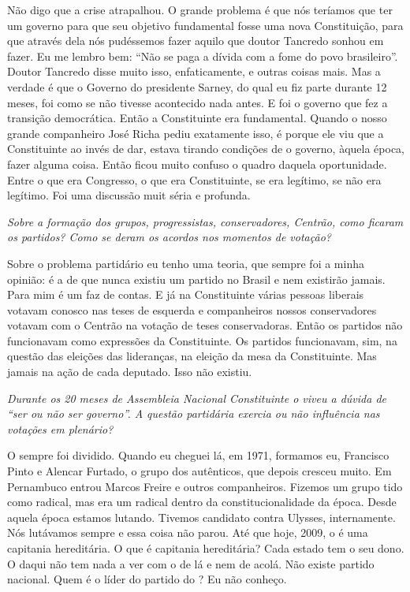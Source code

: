 Não digo que a crise atrapalhou. O grande problema é que
nós teríamos que ter um governo para que seu objetivo fundamental fosse
uma nova Constituição, para que através dela nós pudéssemos fazer aquilo
que doutor Tancredo sonhou em fazer. Eu me lembro bem: ``Não se paga a
dívida com a fome do povo brasileiro''. Doutor Tancredo disse muito
isso, enfaticamente, e outras coisas mais. Mas a verdade é que o Governo
do presidente Sarney, do qual eu fiz parte durante 12 meses, foi como se
não tivesse acontecido nada antes. E foi o governo que fez a transição
democrática. Então a Constituinte era fundamental. Quando o nosso grande
companheiro José Richa pediu exatamente isso, é porque ele viu que a
Constituinte ao invés de dar, estava tirando condições de o governo,
àquela época, fazer alguma coisa. Então ficou muito confuso o quadro
daquela oportunidade. Entre o que era Congresso, o que era Constituinte,
se era legítimo, se não era legítimo. Foi uma discussão muit séria e
profunda.

\medskip

\noindent\emph{Sobre a formação dos grupos, progressistas, conservadores,
Centrão, como ficaram os partidos? Como se deram os acordos nos
momentos de votação?}

Sobre o problema partidário eu tenho uma teoria, que
sempre foi a minha opinião: é a de que nunca existiu um partido no
Brasil e nem existirão jamais. Para mim é um faz de contas. E já na
Constituinte várias pessoas liberais votavam conosco nas teses de
esquerda e companheiros nossos conservadores votavam com o Centrão na
votação de teses conservadoras. Então os partidos não funcionavam como
expressões da Constituinte. Os partidos funcionavam, sim, na questão das
eleições das lideranças, na eleição da mesa da Constituinte. Mas jamais
na ação de cada deputado. Isso não existiu.

\medskip

\noindent\emph{Durante os 20 meses de Assembleia Nacional Constituinte o 
viveu a dúvida de ``ser ou não ser governo''. A questão partidária
exercia ou não influência nas votações em plenário?}

O  sempre foi dividido. Quando eu cheguei lá, em
1971, formamos eu, Francisco Pinto e Alencar Furtado, o grupo dos
autênticos, que depois cresceu muito. Em Pernambuco entrou Marcos Freire
e outros companheiros. Fizemos um grupo tido como radical, mas era um
radical dentro da constitucionalidade da época. Desde aquela época
estamos lutando. Tivemos candidato contra Ulysses, internamente. Nós
lutávamos sempre e essa coisa não parou. Até que hoje, 2009, o  é
uma capitania hereditária. O que é capitania hereditária? Cada estado
tem o seu dono. O  daqui não tem nada a ver com o  de lá e nem
de acolá. Não existe partido nacional. Quem é o líder do partido do
? Eu não conheço.


